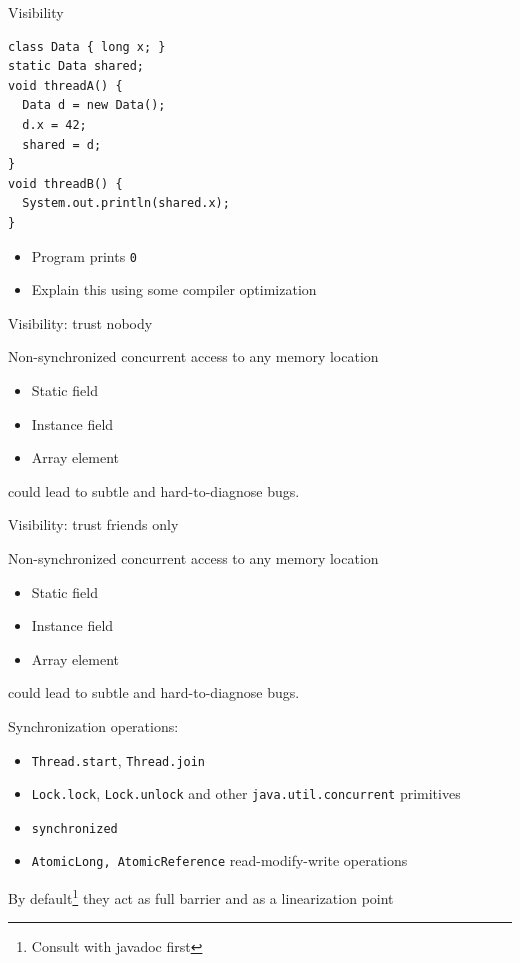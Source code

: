 \begin{frame}{Visibility}
\begin{verbatim}
class Data { long x; }
static Data shared;
void threadA() {
  Data d = new Data();
  d.x = 42;
  shared = d;
}
void threadB() {
  System.out.println(shared.x);
}
\end{verbatim}


\begin{itemize}
  \item Program prints \texttt{0}
  \item Explain this using some compiler optimization
\end{itemize}
\end{frame}


\begin{frame}[t,fragile]{Visibility: trust nobody}

Non-synchronized concurrent access to any memory location
\begin{itemize}
  \item Static field
  \item Instance field
  \item Array element
\end{itemize}
could lead to subtle and hard-to-diagnose bugs.
\end{frame}


\begin{frame}{Visibility: trust friends only}

Non-synchronized concurrent access to any memory location
\begin{itemize}
  \item Static field
  \item Instance field
  \item Array element
\end{itemize}
could lead to subtle and hard-to-diagnose bugs.

Synchronization operations:
\begin{itemize}
  \item \texttt{Thread.start}, \texttt{Thread.join}
  \item \texttt{Lock.lock}, \texttt{Lock.unlock} and other \texttt{java.util.concurrent} primitives
  \item \texttt{synchronized}
  \item \texttt{AtomicLong, AtomicReference} read-modify-write operations
\end{itemize}

\pause

By default\footnote<2->{Consult with javadoc first} they act as full barrier \pause and as a linearization point

\end{frame}

